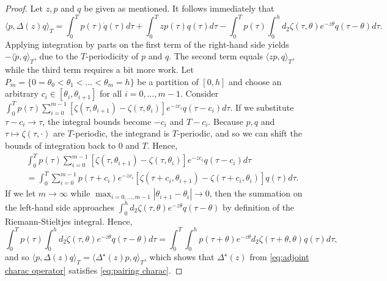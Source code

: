 \documentclass[10pt,a4paper]{amsart}
\begin{document}
\begin{proof}
Let $z,p$ and $q$ be given as mentioned. It follows immediately that
\begin{equation*}
    \langle p, \Delta(z)q \rangle_T = \int_0^T  p(\tau) \dot{q}(\tau) d\tau +  \int_0^T  zp(\tau)q(\tau) d\tau - \int_0^T p(\tau) \int_0^h d_2 \zeta(\tau,\theta) e^{-z\theta}q(\tau-\theta) d\tau.
\end{equation*}
Applying integration by parts on the first term of the right-hand side yields $-\langle \dot{p},q \rangle_T$, due to the $T$-periodicity of $p$ and $q$. The second term equals $\langle zp,q \rangle_T$, while the third term requires a bit more work. Let $P_m = \{0 = \theta_0 < \theta_1 < \dots < \theta_m = h \}$ be a partition of $[0,h]$ and choose an arbitrary $c_i \in [\theta_{i},\theta_{i+1}]$ for all $i = 0,\dots,m-1$. Consider  $\int_0^T  p(\tau) \sum_{i=0}^{m-1} [ \zeta(\tau,\theta_{i+1}) - \zeta(\tau,\theta_i)] e^{-z c_i}q(\tau - c_i)  d\tau$. If we substitute $ \tau - c_i \to \tau$, the integral bounds become $-c_i$ and $T - c_i$. Because $p,q$ and $\tau \mapsto \zeta(\tau,\cdot)$ are $T$-periodic, the integrand is $T$-periodic, and so we can shift the bounds of integration back to $0$ and $T$. Hence,
\begin{align*}
&\int_0^T p(\tau) \sum_{i=0}^{m-1} [ \zeta(\tau,\theta_{i+1}) - \zeta(\tau,\theta_i)] e^{-z c_i}q(\tau - c_i)  d\tau \\
&= \int_0^T \sum_{i=0}^{m-1} p(\tau+c_i) e^{-z c_i}[ \zeta(\tau + c_i,\theta_{i+1}) - \zeta(\tau + c_i,\theta_i)] q(\tau) d\tau.  
\end{align*}
If we let $m \to \infty$ while $\max_{i=0,\dots,m-1} |\theta_{i+1} - \theta_i| \to 0$, then the summation on the left-hand side approaches $\int_0^h d_2 \zeta(\tau,\theta) e^{-z\theta}q(\tau-\theta)$ by definition of the Riemann-Stieltjes integral. Hence,
\begin{equation*}
\int_0^T p(\tau) \int_0^h d_2 \zeta(\tau,\theta) e^{-z\theta}q(\tau-\theta) d\tau = \int_0^T \int_0^h p(\tau + \theta) e^{-z\theta}  d_2\zeta(\tau+\theta,\theta)q(\tau) d\tau,
\end{equation*}
and so $\langle p,\Delta(z)q \rangle_T = \langle \Delta^\star(z)p, q \rangle_T$, which shows that $\Delta^\star(z)$ from \eqref{eq:adjoint charac operator} satisfies \eqref{eq:pairing charac}. 


\end{proof}
\end{document}
